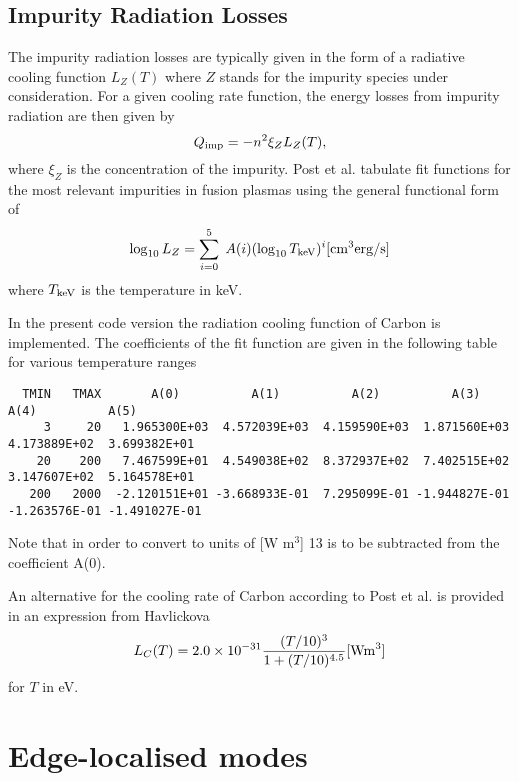\documentclass[amsmath,amssymb,a4]{revtex4-2}
\begin{document}
\subsection{Impurity Radiation Losses}

The impurity radiation losses are typically given in the form of a radiative cooling function $L_Z(T)$ where $Z$ stands for the impurity species under consideration. For a given cooling rate function, the energy losses from impurity radiation are then given by
\begin{equation}\label{impurity_radiation}
    Q_{\rm imp} = - n^2 \xi_Z L_Z(T),
\end{equation}
where $\xi_Z$ is the concentration of the impurity. Post et al.\cite{post1977} tabulate fit functions for the most relevant impurities in fusion plasmas using the general functional form of \cite{post1977}
\begin{equation}\label{cooling_rate}
    \log_{10} L_Z = \sum_{i=0}^5 \; A(i) (\log_{10} T_{\rm keV})^i [{\rm cm}^3 {\rm erg/s}]
\end{equation}
where $T_{\rm keV}$ is the temperature in keV.

In the present code version the radiation cooling function of Carbon is implemented. The coefficients of the fit function are given in the following table for various temperature ranges
\begin{small}\begin{verbatim}
  TMIN   TMAX       A(0)          A(1)          A(2)          A(3)          A(4)          A(5)
     3     20   1.965300E+03  4.572039E+03  4.159590E+03  1.871560E+03  4.173889E+02  3.699382E+01
    20    200   7.467599E+01  4.549038E+02  8.372937E+02  7.402515E+02  3.147607E+02  5.164578E+01
   200   2000  -2.120151E+01 -3.668933E-01  7.295099E-01 -1.944827E-01 -1.263576E-01 -1.491027E-01
\end{verbatim}\end{small}
Note that in order to convert to units of [W m$^3$] 13 is to be subtracted from the coefficient A(0).

An alternative for the cooling rate of Carbon according to Post et al. is provided in an expression from Havlickova \cite{havlickova2013}
\begin{equation}
    L_C(T) = 2.0 \times 10^{-31} {(T/10)^3 \over 1 + (T/10)^{4.5}} [{\rm W m}^3]
\end{equation}
for $T$ in eV.


\section{Edge-localised modes}
\label{section:elms}
\end{document}
